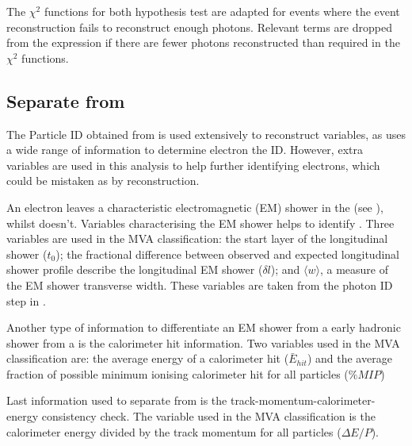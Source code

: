 
The $\chi^{2}$ functions for both hypothesis test are adapted for events where the event reconstruction fails to reconstruct enough photons. Relevant terms are dropped from the expression if there are fewer photons reconstructed  than required in the $\chi^{2}$ functions.

\subsection{Separate \decayElectronShort from \decayPionShort}

The Particle ID obtained from \pandora is used extensively to reconstruct variables, as \pandora uses a wide range of information to determine electron the ID. However, extra variables are used in this analysis to help further identifying electrons, which could be mistaken as \Pgpm by \pandora reconstruction.

An electron leaves a characteristic electromagnetic  (EM) shower in the \ECAL (see ), whilst \Pgpm doesn't. Variables characterising the  EM shower helps to identify \Pem. Three variables are used in the MVA classification: the start layer of the longitudinal shower ($t_0$); the fractional difference between observed and expected longitudinal shower profile describe the longitudinal EM shower ($\delta{l}$); and $\langle{w}\rangle$, a measure of the EM shower transverse width. These variables are  taken from the photon ID step in .

Another type of information to differentiate an EM shower from a early hadronic shower from a \Pgpm is the calorimeter hit information. Two variables used in the MVA classification are: the average energy of a calorimeter hit ($\bar{E}_{hit}$) and the average fraction of possible minimum ionising calorimeter hit for all particles ($\%MIP$)

Last information used to separate \Pem from \Pgpm is the track-momentum-calorimeter-energy consistency check. The variable used in the MVA classification is the calorimeter energy divided by the track momentum for all particles ($\Delta E/P$).



